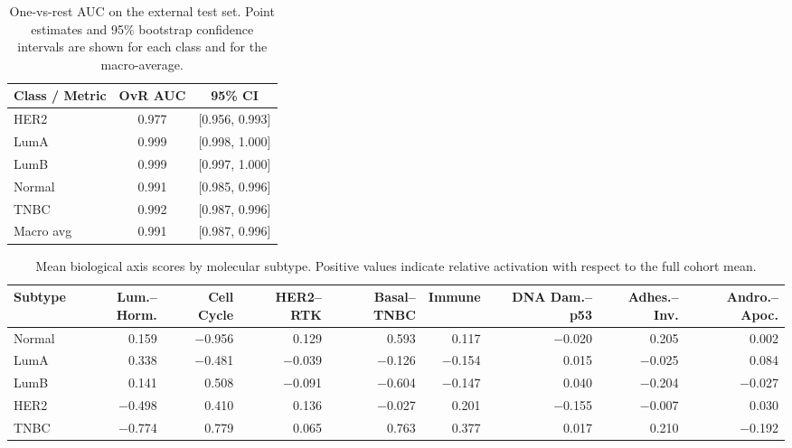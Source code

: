 \documentclass[11pt,a4paper]{article}
\begin{document}
\begin{table}[!htbp]
\centering
\caption{One-vs-rest AUC on the external test set. Point estimates and 95\% bootstrap confidence intervals are shown for each class and for the macro-average.}
\label{tab:sup_auc_bootstrap}
\begin{tabular}{lcc}
\toprule
\textbf{Class / Metric} & \textbf{OvR AUC} & \textbf{95\% CI} \\
\midrule
HER2      & 0.977 & [0.956, 0.993] \\
LumA      & 0.999 & [0.998, 1.000] \\
LumB      & 0.999 & [0.997, 1.000] \\
Normal    & 0.991 & [0.985, 0.996] \\
TNBC      & 0.992 & [0.987, 0.996] \\
\midrule
Macro avg & 0.991 & [0.987, 0.996] \\
\bottomrule
\end{tabular}
\end{table}





\begin{landscape}
\begin{table}[!htbp]
\centering
\caption{Mean biological axis scores by molecular subtype. Positive values indicate relative activation with respect to the full cohort mean.}
\label{tab:sup_mean_axis_subtype}
\begin{tabular}{lrrrrrrrr}
\toprule
\textbf{Subtype} & \textbf{Lum.–Horm.} & \textbf{Cell Cycle} & \textbf{HER2–RTK} & \textbf{Basal–TNBC} & \textbf{Immune} & \textbf{DNA Dam.–p53} & \textbf{Adhes.–Inv.} & \textbf{Andro.–Apoc.} \\
\midrule
Normal &  0.159 & $-$0.956 &  0.129 &  0.593 &  0.117 & $-$0.020 &  0.205 &  0.002 \\
LumA   &  0.338 & $-$0.481 & $-$0.039 & $-$0.126 & $-$0.154 &  0.015 & $-$0.025 &  0.084 \\
LumB   &  0.141 &  0.508 & $-$0.091 & $-$0.604 & $-$0.147 &  0.040 & $-$0.204 & $-$0.027 \\
HER2   & $-$0.498 &  0.410 &  0.136 & $-$0.027 &  0.201 & $-$0.155 & $-$0.007 &  0.030 \\
TNBC   & $-$0.774 &  0.779 &  0.065 &  0.763 &  0.377 &  0.017 &  0.210 & $-$0.192 \\
\bottomrule
\end{tabular}
\end{table}
\end{landscape}
\end{document}
